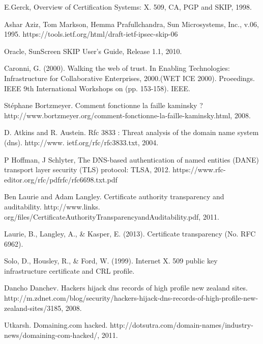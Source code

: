 \documentclass[journal, a4paper]{IEEEtran}
\begin{document}
\begin{thebibliography}{99}

 E.Gerck, Overview of Certification Systems: X. 509, CA, PGP and SKIP, 1998.

 Ashar Aziz, Tom Markson, Hemma Prafullchandra, Sun Microsystems, Inc., v.06, 1995. https://tools.ietf.org/html/draft-ietf-ipsec-skip-06

 Oracle, SunScreen SKIP User's Guide, Release 1.1, 2010. %

 Caronni, G. (2000). Walking the web of trust. In Enabling Technologies: Infrastructure for Collaborative Enterprises, 2000.(WET ICE 2000). Proeedings. IEEE 9th International Workshops on (pp. 153-158). IEEE. %

 Stéphane Bortzmeyer. Comment fonctionne la faille kaminsky ? http://www.bortzmeyer.org/comment-fonctionne-la-faille-kaminsky.html, 2008.

 D. Atkins and R. Austein. Rfc 3833 : Threat analysis of the domain name system (dns). http://www.
ietf.org/rfc/rfc3833.txt, 2004.

 P Hoffman, J Schlyter, The DNS-based authentication of named entities (DANE) transport layer security (TLS) protocol: TLSA, 2012. https://www.rfc-editor.org/rfc/pdfrfc/rfc6698.txt.pdf

 Ben Laurie and Adam Langley. Certificate authority transparency and auditability. http://www.links.
org/files/CertificateAuthorityTransparencyandAuditability.pdf, 2011.

 Laurie, B., Langley, A., \& Kasper, E. (2013). Certificate transparency (No. RFC 6962). %

 Solo, D., Housley, R., \& Ford, W. (1999). Internet X. 509 public key infrastructure certificate and CRL profile. %

 Dancho Danchev. Hackers hijack dns records of high profile new zealand sites. http://m.zdnet.com/blog/security/hackers-hijack-dns-records-of-high-profile-new-zealand-sites/3185, 2008.

 Utkarsh. Domaining.com hacked. http://dotsutra.com/domain-names/industry-news/domaining-com-hacked/, 2011.

\end{thebibliography}

\end{document}
